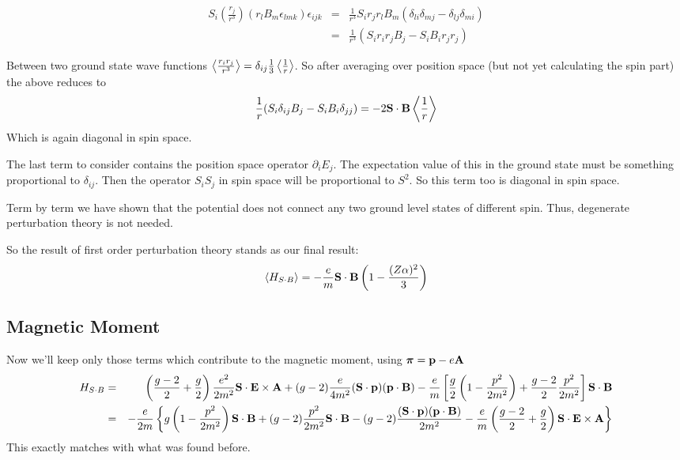 \begin{eqnarray*}
S_i \left( \frac{r_j}{r^3} \right) (r_l B_m \epsilon_{lmk}) \epsilon_{ijk}
	&=&	\frac{1}{r^3} S_i r_j r_l B_m (\delta_{li} \delta_{mj} - \delta_{lj} \delta_{mi} )	\\
	&=&	\frac{1}{r^3} (S_i r_i r_j B_j - S_i B_i r_j r_j)
\end{eqnarray*}	

Between two ground state wave functions $\left< \frac{r_i r_j}{r^3} \right>=\delta_{ij}\frac{1}{3}\left< \frac{1}{r} \right>$.  So after averaging over position space (but not yet calculating the spin part) the above reduces to
\[	 
	\frac{1}{r} (S_i \delta_{ij} B_j - S_i B_i \delta_{jj})
	= -2 \mathbf{S} \cdot \mathbf{B} \left< \frac{1}{r} \right>
\]
Which is again diagonal in spin space.

The last term to consider contains the position space operator $\partial_i E_j$.  The expectation value of this in the ground state must be something proportional to $\delta_{ij}$.  Then the operator $S_i S_j$ in spin space will be proportional to $S^2$.  So this term too is diagonal in spin space.

Term by term we have shown that the potential does not connect any two ground level states of different spin.  Thus, degenerate perturbation theory is not needed.

So the result of first order perturbation theory stands as our final result:
\[ \left< H_{S \cdot B}  \right>
	=  - \frac{e}{m} \mathbf{S} \cdot \mathbf{B} \left (1 - \frac{(Z\alpha)^2}{3} \right )			 
\]


\subsection*{Magnetic Moment}
Now we'll keep only those terms which contribute to the magnetic moment, using $\mbox{\boldmath$ \pi $} = \mathbf{p} - e\mathbf{A}$
\begin{eqnarray*}
H_{S\cdot B}	&=&
		 \left(\frac{g-2}{2} + 	\frac{g}{2}\right)\frac{e^2}{2m^2} \mathbf{S} \cdot \mathbf{E} \times \mathbf{A}
		+  (g-2)\frac{e}{4m^2} (\mathbf{S} \cdot \mathbf{p}) (\mathbf{p} \cdot \mathbf{B})
		-  \frac{e}{m}\left [\frac{g}{2}\left(1 - \frac{p^2}{2m^2}\right) + \frac{g-2}{2}\frac{p^2}{2m^2} \right] \mathbf{S} 		\cdot \mathbf{B}		\\
	&=&		-\frac{e}{2m} \left\{
			g \left(1 - \frac{p^2}{2m^2}\right)  \mathbf{S} \cdot \mathbf{B}	
			+(g-2) \frac{p^2}{2m^2} \mathbf{S} \cdot \mathbf{B}	
			-(g-2) \frac{ (\mathbf{S} \cdot \mathbf{p}) (\mathbf{p} \cdot \mathbf{B})}{2m^2}
			-\frac{e}{m} \left(\frac{g-2}{2} + 	\frac{g}{2}\right) \mathbf{S} \cdot \mathbf{E} \times \mathbf{A}
		\right\}
\end{eqnarray*}
This exactly matches with what was found before.
